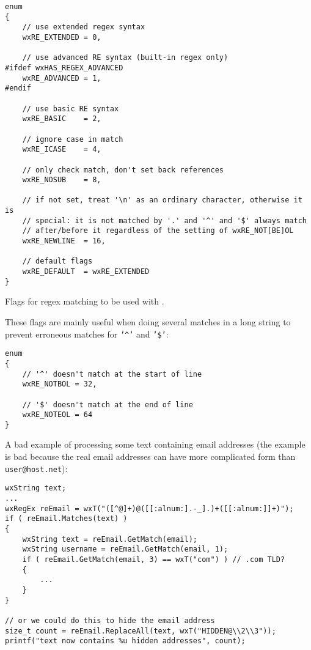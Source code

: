 \begin{verbatim}
enum
{
    // use extended regex syntax
    wxRE_EXTENDED = 0,
    
    // use advanced RE syntax (built-in regex only)
#ifdef wxHAS_REGEX_ADVANCED
    wxRE_ADVANCED = 1,
#endif

    // use basic RE syntax
    wxRE_BASIC    = 2,

    // ignore case in match
    wxRE_ICASE    = 4,

    // only check match, don't set back references
    wxRE_NOSUB    = 8,

    // if not set, treat '\n' as an ordinary character, otherwise it is
    // special: it is not matched by '.' and '^' and '$' always match
    // after/before it regardless of the setting of wxRE_NOT[BE]OL
    wxRE_NEWLINE  = 16,

    // default flags
    wxRE_DEFAULT  = wxRE_EXTENDED
}
\end{verbatim}

Flags for regex matching to be used with .

These flags are mainly useful when doing several matches in a long string
to prevent erroneous matches for {\tt '\textasciicircum'} and {\tt '\$'}:

\begin{verbatim}
enum
{
    // '^' doesn't match at the start of line
    wxRE_NOTBOL = 32,

    // '$' doesn't match at the end of line
    wxRE_NOTEOL = 64
}
\end{verbatim}


A bad example of processing some text containing email addresses (the example
is bad because the real email addresses can have more complicated form than
{\tt user@host.net}):

\begin{verbatim}
wxString text;
...
wxRegEx reEmail = wxT("([^@]+)@([[:alnum:].-_].)+([[:alnum:]]+)");
if ( reEmail.Matches(text) )
{
    wxString text = reEmail.GetMatch(email);
    wxString username = reEmail.GetMatch(email, 1);
    if ( reEmail.GetMatch(email, 3) == wxT("com") ) // .com TLD?
    {
        ...
    }
}

// or we could do this to hide the email address
size_t count = reEmail.ReplaceAll(text, wxT("HIDDEN@\\2\\3"));
printf("text now contains %u hidden addresses", count);
\end{verbatim}

